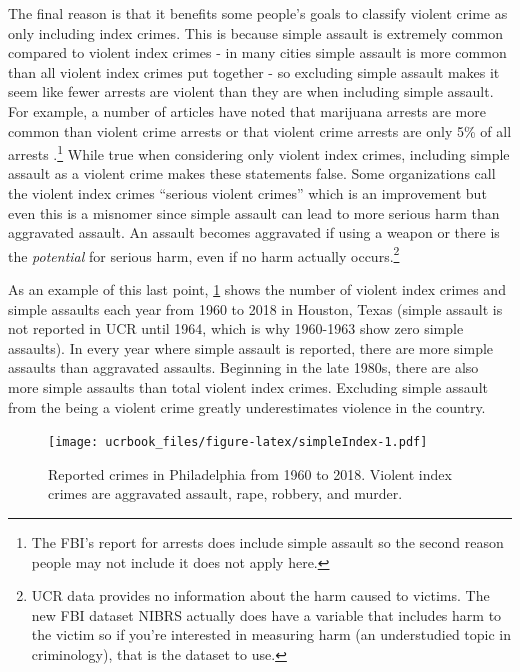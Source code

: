 \documentclass[
  12pt,
  openany]{book}
\begin{document}
The final reason is that it benefits some people's goals to classify violent crime as only including index crimes. This is because simple assault is extremely common compared to violent index crimes - in many cities simple assault is more common than all violent index crimes put together - so excluding simple assault makes it seem like fewer arrests are violent than they are when including simple assault. For example, a number of articles have noted that marijuana arrests are more common than violent crime arrests \citep{ingraham2016, kertscher2019, devito2020, earlenbaugh2020, aclu2020} or that violent crime arrests are only 5\% of all arrests \citep{neusteter2019every, speri2019}.\footnote{The FBI's report for arrests does include simple assault so the second reason people may not include it does not apply here.} While true when considering only violent index crimes, including simple assault as a violent crime makes these statements false. Some organizations call the violent index crimes ``serious violent crimes'' which is an improvement but even this is a misnomer since simple assault can lead to more serious harm than aggravated assault. An assault becomes aggravated if using a weapon or there is the \emph{potential} for serious harm, even if no harm actually occurs.\footnote{UCR data provides no information about the harm caused to victims. The new FBI dataset NIBRS actually does have a variable that includes harm to the victim so if you're interested in measuring harm (an understudied topic in criminology), that is the dataset to use.}

As an example of this last point, \ref{fig:simpleIndex} shows the number of violent index crimes and simple assaults each year from 1960 to 2018 in Houston, Texas (simple assault is not reported in UCR until 1964, which is why 1960-1963 show zero simple assaults). In every year where simple assault is reported, there are more simple assaults than aggravated assaults. Beginning in the late 1980s, there are also more simple assaults than total violent index crimes. Excluding simple assault from the being a violent crime greatly underestimates violence in the country.

\begin{figure}
\centering
\texttt{[image: ucrbook\_files/figure-latex/simpleIndex-1.pdf]}
\caption{\label{fig:simpleIndex}Reported crimes in Philadelphia from 1960 to 2018. Violent index crimes are aggravated assault, rape, robbery, and murder.}
\end{figure}
\end{document}

